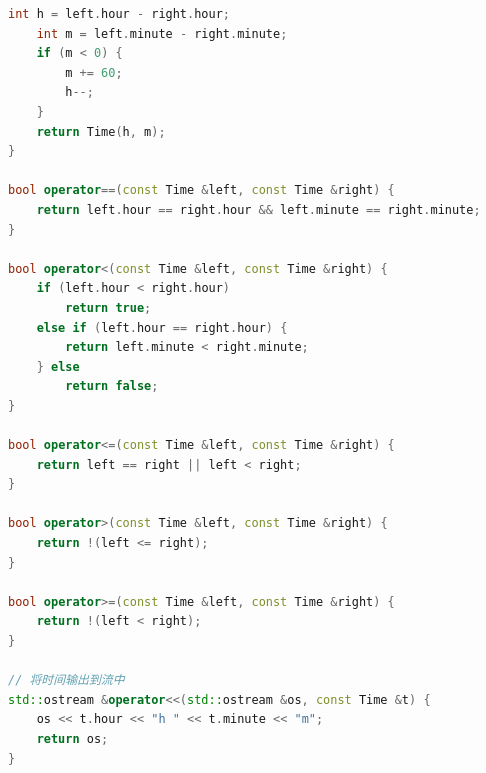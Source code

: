 \documentclass{ctexart}
\begin{document}
\begin{lstlisting}[language=C++,caption=Time类的实现,label=code1]
    int h = left.hour - right.hour;
    int m = left.minute - right.minute;
    if (m < 0) {
        m += 60;
        h--;
    }
    return Time(h, m);
}

bool operator==(const Time &left, const Time &right) {
    return left.hour == right.hour && left.minute == right.minute;
}

bool operator<(const Time &left, const Time &right) {
    if (left.hour < right.hour)
        return true;
    else if (left.hour == right.hour) {
        return left.minute < right.minute;
    } else
        return false;
}

bool operator<=(const Time &left, const Time &right) {
    return left == right || left < right;
}

bool operator>(const Time &left, const Time &right) {
    return !(left <= right);
}

bool operator>=(const Time &left, const Time &right) {
    return !(left < right);
}

// 将时间输出到流中
std::ostream &operator<<(std::ostream &os, const Time &t) {
    os << t.hour << "h " << t.minute << "m";
    return os;
} 
\end{lstlisting}
\end{document}

